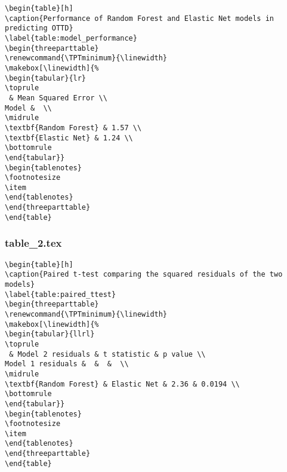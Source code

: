 \documentclass[11pt]{article}
\begin{document}
\begin{Verbatim}[tabsize=4]
\begin{table}[h]
\caption{Performance of Random Forest and Elastic Net models in predicting OTTD}
\label{table:model_performance}
\begin{threeparttable}
\renewcommand{\TPTminimum}{\linewidth}
\makebox[\linewidth]{%
\begin{tabular}{lr}
\toprule
 & Mean Squared Error \\
Model &  \\
\midrule
\textbf{Random Forest} & 1.57 \\
\textbf{Elastic Net} & 1.24 \\
\bottomrule
\end{tabular}}
\begin{tablenotes}
\footnotesize
\item
\end{tablenotes}
\end{threeparttable}
\end{table}

\end{Verbatim}

\subsubsection*{table\_2.tex}

\begin{Verbatim}[tabsize=4]
\begin{table}[h]
\caption{Paired t-test comparing the squared residuals of the two models}
\label{table:paired_ttest}
\begin{threeparttable}
\renewcommand{\TPTminimum}{\linewidth}
\makebox[\linewidth]{%
\begin{tabular}{llrl}
\toprule
 & Model 2 residuals & t statistic & p value \\
Model 1 residuals &  &  &  \\
\midrule
\textbf{Random Forest} & Elastic Net & 2.36 & 0.0194 \\
\bottomrule
\end{tabular}}
\begin{tablenotes}
\footnotesize
\item
\end{tablenotes}
\end{threeparttable}
\end{table}

\end{Verbatim}
\end{document}
